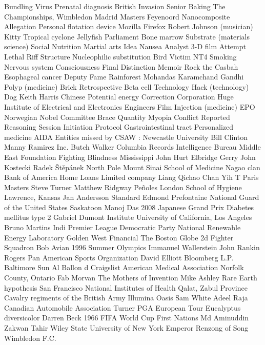 Bundling  Virus  Prenatal diagnosis  
British Invasion  Senior  Baking  
The Championships, Wimbledon  Madrid Masters  Feyenoord  
Nanocomposite  Allegation  Personal flotation device  
Mozilla Firefox  Robert Johnson (musician)  Kitty  
Tropical cyclone  Jellyfish  Parliament  
Bone marrow  Substrate (materials science)  Social  
Nutrition  Martial arts  Idea  
Nausea  Analyst  3-D film  
Attempt  Lethal  Riff  
Structure  Nucleophilic substitution  Bird  
Victim  NT4  Smoking  
Nervous system  Consciousness  Final  
Distinction  Memoir  Rock the Casbah  
Esophageal cancer  Deputy  Fame  
Rainforest  Mohandas Karamchand Gandhi  Polyp (medicine)  
Brick  Retrospective  Beta cell  
Technology  Hack (technology)  Dog  
Keith Harris  Chinese  Potential energy  
Correction  Corporation  Huge  
Institute of Electrical and Electronics Engineers  Film  Injection (medicine)  
EPO  Norwegian Nobel Committee  Brace  
Quantity  Myopia  Conflict  
Reported  Reasoning  Session Initiation Protocol  
Gastrointestinal tract  Personalized medicine  AIDA Entities missed by CSAW : 
Newcastle University  
Bill Clinton  Manny Ramirez  Inc.   
Butch Walker  Columbia Records  Intelligence Bureau   
Middle East  Foundation Fighting Blindness  Mississippi John Hurt  
Elbridge Gerry  John Kostecki  Radek Štěpánek  
North Pole  Mount Sinai School of Medicine  Nagao clan  
Bank of America Home Loans  Limited company  Liang Qichao  
Chan Yih  T  Paris Masters  
Steve Turner   Matthew Ridgway  Peñoles  
London School of Hygiene   Lawrence, Kansas  Jan Andersson   
Standard   Edmond Prefontaine  National Guard of the United States  
Saskatoon  Manoj Das  2008 Japanese Grand Prix  
Diabetes mellitus type 2  Gabriel Dumont Institute  University of California, Los Angeles  
Bruno Martins Indi  Premier League  Democratic Party   
National Renewable Energy Laboratory  Golden West Financial  The Boston Globe  
2d Fighter Squadron  Bob Avian  1996 Summer Olympics  
Immanuel Wallerstein  John Rankin Rogers  Pan American Sports Organization  
David Elliott   Bloomberg L.P.  Baltimore  
Sun  Al  Ballon d  
Craigslist  American Medical Association  Norfolk County, Ontario  
Fab Morvan  The Mothers of Invention  Mike Ashley   
Rare Earth hypothesis  San Francisco  National Institutes of Health  
Qalat, Zabul Province  Cavalry regiments of the British Army  Illumina   
Oasis   Sam White   Adeel Raja  
Canadian Automobile Association  Turner  PGA European Tour  
Eucalyptus diversicolor  Darren Beck  1966 FIFA World Cup  
First Nations  Md Aminuddin Zakwan Tahir  Wiley  
State University of New York  Emperor Renzong of Song  Wimbledon F.C.  

